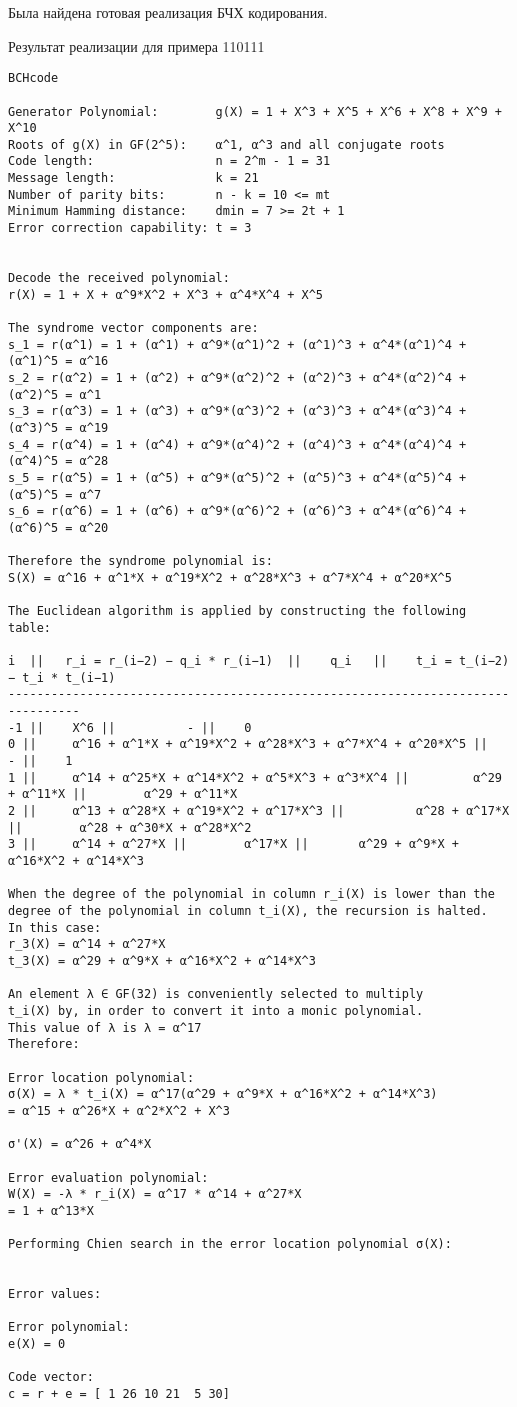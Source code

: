 Была найдена готовая реализация БЧХ кодирования.

Результат реализации для примера 110111

\begin{lstlisting}
BCHcode

Generator Polynomial:        g(X) = 1 + X^3 + X^5 + X^6 + X^8 + X^9 + X^10
Roots of g(X) in GF(2^5):    α^1, α^3 and all conjugate roots
Code length:                 n = 2^m - 1 = 31
Message length:              k = 21
Number of parity bits:       n - k = 10 <= mt
Minimum Hamming distance:    dmin = 7 >= 2t + 1
Error correction capability: t = 3


Decode the received polynomial:
r(X) = 1 + X + α^9*X^2 + X^3 + α^4*X^4 + X^5

The syndrome vector components are:
s_1 = r(α^1) = 1 + (α^1) + α^9*(α^1)^2 + (α^1)^3 + α^4*(α^1)^4 + (α^1)^5 = α^16
s_2 = r(α^2) = 1 + (α^2) + α^9*(α^2)^2 + (α^2)^3 + α^4*(α^2)^4 + (α^2)^5 = α^1
s_3 = r(α^3) = 1 + (α^3) + α^9*(α^3)^2 + (α^3)^3 + α^4*(α^3)^4 + (α^3)^5 = α^19
s_4 = r(α^4) = 1 + (α^4) + α^9*(α^4)^2 + (α^4)^3 + α^4*(α^4)^4 + (α^4)^5 = α^28
s_5 = r(α^5) = 1 + (α^5) + α^9*(α^5)^2 + (α^5)^3 + α^4*(α^5)^4 + (α^5)^5 = α^7
s_6 = r(α^6) = 1 + (α^6) + α^9*(α^6)^2 + (α^6)^3 + α^4*(α^6)^4 + (α^6)^5 = α^20

Therefore the syndrome polynomial is:
S(X) = α^16 + α^1*X + α^19*X^2 + α^28*X^3 + α^7*X^4 + α^20*X^5

The Euclidean algorithm is applied by constructing the following table:

i  ||   r_i = r_(i−2) − q_i * r_(i−1)  ||    q_i   ||    t_i = t_(i−2) − t_i * t_(i−1)
--------------------------------------------------------------------------------
-1 ||    X^6 ||          - ||    0
0 ||     α^16 + α^1*X + α^19*X^2 + α^28*X^3 + α^7*X^4 + α^20*X^5 ||      - ||    1
1 ||     α^14 + α^25*X + α^14*X^2 + α^5*X^3 + α^3*X^4 ||         α^29 + α^11*X ||        α^29 + α^11*X
2 ||     α^13 + α^28*X + α^19*X^2 + α^17*X^3 ||          α^28 + α^17*X ||        α^28 + α^30*X + α^28*X^2
3 ||     α^14 + α^27*X ||        α^17*X ||       α^29 + α^9*X + α^16*X^2 + α^14*X^3

When the degree of the polynomial in column r_i(X) is lower than the
degree of the polynomial in column t_i(X), the recursion is halted.
In this case:
r_3(X) = α^14 + α^27*X
t_3(X) = α^29 + α^9*X + α^16*X^2 + α^14*X^3

An element λ ∈ GF(32) is conveniently selected to multiply
t_i(X) by, in order to convert it into a monic polynomial.
This value of λ is λ = α^17
Therefore:

Error location polynomial:
σ(X) = λ * t_i(X) = α^17(α^29 + α^9*X + α^16*X^2 + α^14*X^3)
= α^15 + α^26*X + α^2*X^2 + X^3

σ'(X) = α^26 + α^4*X

Error evaluation polynomial:
W(X) = -λ * r_i(X) = α^17 * α^14 + α^27*X
= 1 + α^13*X

Performing Chien search in the error location polynomial σ(X):


Error values:

Error polynomial:
e(X) = 0

Code vector:
c = r + e = [ 1 26 10 21  5 30]
\end{lstlisting}

